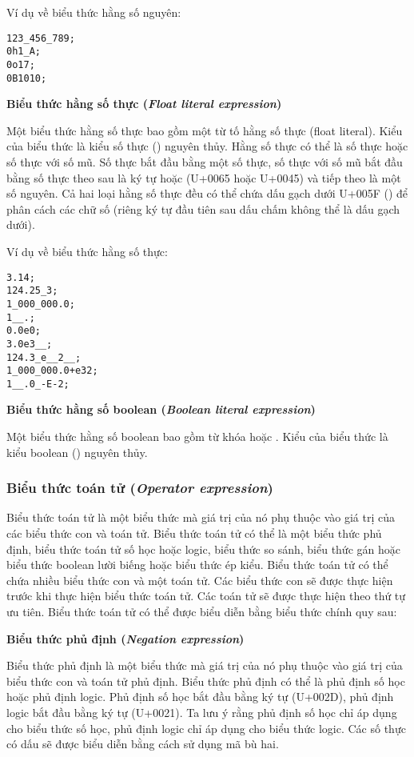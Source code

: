\noindent Ví dụ về biểu thức hằng số nguyên:
\begin{lstlisting}[]
123_456_789;
0h1_A;
0o17;
0B1010;
\end{lstlisting}

\noindent\textbf{Biểu thức hằng số thực (\textit{Float literal expression})}

    Một biểu thức hằng số thực bao gồm một từ tố hằng số thực (float literal). Kiểu của biểu thức là kiểu số thực () nguyên thủy. Hằng số thực có thể là số thực hoặc số thực với số mũ. Số thực bắt đầu bằng một số thực, số thực với số mũ bắt đầu bằng số thực theo sau là ký tự  hoặc  (U+0065 hoặc U+0045) và tiếp theo là một số nguyên. Cả hai loại hằng số thực đều có thể chứa dấu gạch dưới U+005F (\kw{\_}) để phân cách các chữ số (riêng ký tự đầu tiên sau dấu chấm không thể là dấu gạch dưới).

\noindent Ví dụ về biểu thức hằng số thực:
\begin{lstlisting}[]
3.14;
124.25_3;
1_000_000.0;
1__.;
0.0e0;
3.0e3__;
124.3_e__2__;
1_000_000.0+e32;
1__.0_-E-2;
\end{lstlisting}

\noindent\textbf{Biểu thức hằng số boolean (\textit{Boolean literal expression})}

    Một biểu thức hằng số boolean bao gồm từ khóa  hoặc . Kiểu của biểu thức là kiểu boolean () nguyên thủy.

\subsubsection{Biểu thức toán tử (\textit{Operator expression})}

    Biểu thức toán tử là một biểu thức mà giá trị của nó phụ thuộc vào giá trị của các biểu thức con và toán tử. Biểu thức toán tử có thể là một biểu thức phủ định, biểu thức toán tử số học hoặc logic, biểu thức so sánh, biểu thức gán hoặc biểu thức boolean lười biếng hoặc biểu thức ép kiểu. Biểu thức toán tử có thể chứa nhiều biểu thức con và một toán tử. Các biểu thức con sẽ được thực hiện trước khi thực hiện biểu thức toán tử. Các toán tử sẽ được thực hiện theo thứ tự ưu tiên. Biểu thức toán tử có thể được biểu diễn bằng biểu thức chính quy sau:

\regexopexpr

\noindent\textbf{Biểu thức phủ định (\textit{Negation expression})}

    Biểu thức phủ định là một biểu thức mà giá trị của nó phụ thuộc vào giá trị của biểu thức con và toán tử phủ định. Biểu thức phủ định có thể là phủ định số học hoặc phủ định logic. Phủ định số học bắt đầu bằng ký tự \kw{-} (U+002D), phủ định logic bắt đầu bằng ký tự \kw{!} (U+0021). Ta lưu ý rằng phủ định số học chỉ áp dụng cho biểu thức số học, phủ định logic chỉ áp dụng cho biểu thức logic. Các số thực có dấu sẽ được biểu diễn bằng cách sử dụng mã bù hai.

